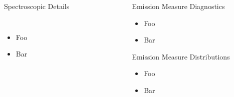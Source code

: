 \documentclass[final]{beamer}
\begin{document}
\begin{frame}
\begin{columns}[T]
\begin{column}{0.49\linewidth}
    \begin{block}{Spectroscopic Details}
      \begin{columns}[T]
      \begin{column}{0.49\columnwidth}
        \vspace{-2ex}
        \begin{figure}
        \end{figure}
      \end{column}
      \begin{column}{0.49\columnwidth}
        \vspace{-6ex}
        \begin{figure}
        \end{figure}
        \vspace{-2ex}
      \end{column}
      \end{columns}
      \begin{itemize}
      \item Foo
      \item Bar
      \end{itemize}
    \end{block}
  \end{column}
  \begin{column}{0.49\linewidth}
    \begin{block}{Emission Measure Diagnostics}
      \vspace{-1ex}
      \begin{itemize}
      \item Foo
      \item Bar
      \end{itemize}
      \vspace{-2ex}
      \begin{figure}
      \end{figure}
      \vspace{-2ex}
    \end{block}
    \begin{block}{Emission Measure Distributions}
      \vspace{-1ex}
      \begin{itemize}
      \item Foo
      \item Bar
      \end{itemize}
      \vspace{-2ex}
      \begin{figure}
      \end{figure}

\end{block}
\end{column}
\end{columns}
\end{frame}
\end{document}
